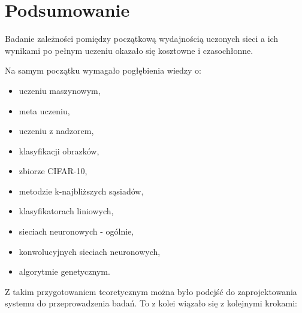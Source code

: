 \chapter{Podsumowanie}\label{chap:summary}

Badanie zależności pomiędzy początkową wydajnością uczonych sieci a ich wynikami po pełnym uczeniu okazało się kosztowne i czasochłonne.

Na samym początku wymagało pogłębienia wiedzy o:

\begin{itemize}
  \item uczeniu maszynowym,
  \item meta uczeniu,
  \item uczeniu z nadzorem,
  \item klasyfikacji obrazków,
  \item zbiorze CIFAR-10,
  \item metodzie k-najbliższych sąsiadów,
  \item klasyfikatorach liniowych,
  \item sieciach neuronowych - ogólnie,
  \item konwolucyjnych sieciach neuronowych,
  \item algorytmie genetycznym.
\end{itemize}

Z takim przygotowaniem teoretycznym można było podejść do zaprojektowania systemu do przeprowadzenia badań.
To z kolei wiązało się z kolejnymi krokami:

